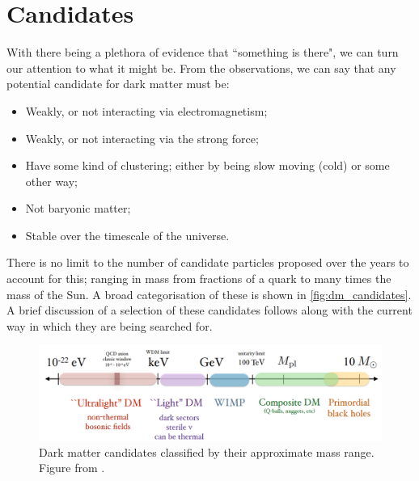 \section{Candidates}
\par
With there being a plethora of evidence that ``something is there", we can turn our attention to what it might be.
From the observations, we can say that any potential candidate for dark matter must be:
\begin{itemize}
    \item Weakly, or not interacting via electromagnetism;
    \item Weakly, or not interacting via the strong force;
    \item Have some kind of clustering; either by being slow moving (cold) or some other way;
    \item Not baryonic matter;
    \item Stable over the timescale of the universe.
\end{itemize}
There is no limit to the number of candidate particles proposed over the years to account for this; ranging in mass from fractions of a quark to many times the mass of the Sun.
A broad categorisation of these is shown in \autoref{fig:dm_candidates}.
A brief discussion of a selection of these candidates follows along with the current way in which they are being searched for.
\begin{figure}[!h]
    \centering
    \includegraphics[width=15cm]{Figures/DarkMatterEvidence/dark_matter_candidates.png}
    \caption{Dark matter candidates classified by their approximate mass range. Figure from \cite{dm_figure_candidates_ref}.}
    \label{fig:dm_candidates}
\end{figure}


